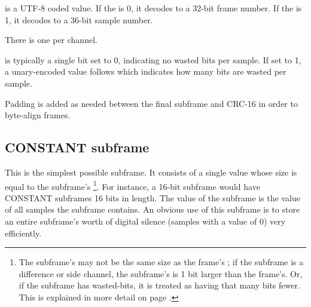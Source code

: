 \noindent
{} is a UTF-8 coded value.
If the  is 0, it decodes to a 32-bit frame number.
If the  is 1, it decodes to a 36-bit sample number.

There is one  per channel.

 is typically a single bit set to 0, indicating
no wasted bits per sample.  If set to 1, a unary-encoded value
follows which indicates how many bits are wasted per sample.

Padding is added as needed between the final subframe and CRC-16
in order to byte-align frames.

\pagebreak

\subsection{CONSTANT subframe}

This is the simplest possible subframe.
It consists of a single value whose size is equal to the subframe's
\footnote{
The subframe's  may not be the same size as the frame's
;
if the subframe is a difference or side channel, the subframe's
 is 1 bit larger than the frame's.
Or, if the subframe has wasted-bits, it is treated as having
that many bits fewer.
This is explained in more detail on page \pageref{flac_channels}.}.
For instance, a 16-bit subframe would have CONSTANT subframes
16 bits in length.
The value of the subframe is the value of all samples the subframe
contains.
An obvious use of this subframe is to store an entire subframe's worth
of digital silence (samples with a value of 0) very efficiently.

